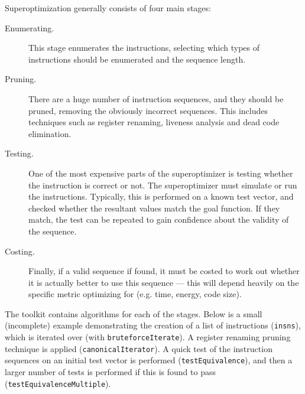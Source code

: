 \documentclass{article}
\begin{document}
Superoptimization generally consists of four main stages:

\begin{description}
    \item[Enumerating.] This stage enumerates the instructions, selecting which types of instructions should be enumerated and the sequence length.
    \item[Pruning.] There are a huge number of instruction sequences, and they should be pruned, removing the obviously incorrect sequences. This includes techniques such as register renaming, liveness analysis and dead code elimination.
    \item[Testing.] One of the most expensive parts of the superoptimizer is testing whether the instruction is correct or not. The superoptimizer must simulate or run the instructions. Typically, this is performed on a known test vector, and checked whether the resultant values match the goal function. If they match, the test can be repeated to gain confidence about the validity of the sequence.
    \item[Costing.] Finally, if a valid sequence if found, it must be costed to work out whether it is actually better to use this sequence --- this will depend heavily on the specific metric optimizing for (e.g. time, energy, code size).
\end{description}

The toolkit contains algorithms for each of the stages. Below is a small (incomplete) example demonstrating the creation of a list of instructions (\texttt{insns}), which is iterated over (with \texttt{bruteforceIterate}). A register renaming pruning technique is applied (\texttt{canonicalIterator}). A quick test of the instruction sequences on an initial test vector is performed (\texttt{testEquivalence}), and then a larger number of tests is performed if this is found to pass (\texttt{testEquivalenceMultiple}).
\end{document}
